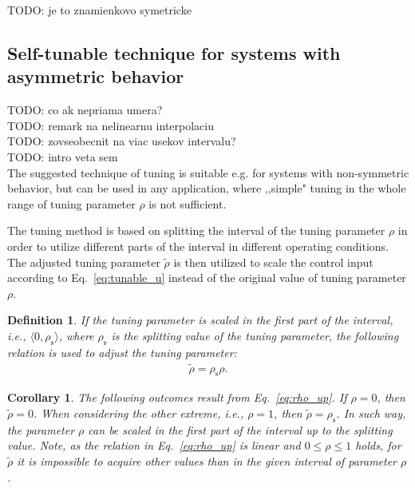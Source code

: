 \documentclass[preprint,12pt]{elsarticle}
\newtheorem{corollary}{Corollary}[theorem]
\newtheorem{definition}{Definition}[section]
\begin{document}
TODO: je to znamienkovo symetricke

\subsection{Self-tunable technique for systems with asymmetric behavior}
\label{sec:self_tunable_rho_scaling}
TODO: co ak nepriama umera? \\
TODO: remark na nelinearnu interpolaciu \\
TODO: zovseobecnit na viac usekov intervalu? \\
TODO: intro veta sem\\

The suggested technique of tuning is suitable e.g. for systems with non-symmetric behavior, but can be used in any application, where ,,simple" tuning in the whole range of tuning parameter $\rho$ is not sufficient.

The tuning method is based on splitting the interval of the tuning parameter $\rho$ in order to utilize different parts of the interval in different operating conditions. The adjusted tuning parameter $\widetilde{\rho}$ is then utilized to scale the control input according to Eq.~\eqref{eq:tunable_u} instead of the original value of tuning parameter $\rho$.     

\begin{definition}
	If the tuning parameter is scaled in the first part of the interval, i.e., $\langle 0, \rho_{\mathrm{s}} \rangle$, where $\rho_{\mathrm{s}}$ is the splitting value of the tuning parameter, the following relation is used to adjust the tuning parameter:
	\begin{eqnarray}
		\label{eq:rho_up}
		\widetilde{\rho} = \rho_{\mathrm{s}} \rho.
	\end{eqnarray}
\end{definition}

\begin{corollary}
	The following outcomes result from Eq.~\eqref{eq:rho_up}. If $\rho=0$, then $\widetilde{\rho} = 0$. When considering the other extreme, i.e., $\rho=1$, then $\widetilde{\rho} = \rho_{\mathrm{s}}$. In such way, the parameter $\rho$ can be scaled in the first part of the interval up to the splitting value. Note, as the relation in Eq.~\eqref{eq:rho_up} is linear and $0 \le \rho \le 1$ holds, for $\widetilde{\rho}$ it is impossible to acquire other values than in the given interval of parameter $\rho$.   
\end{corollary}
\end{document}
